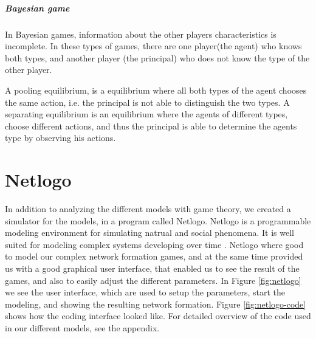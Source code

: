 \subparagraph{Bayesian game}
In Bayesian games, information about the other players characteristics is incomplete. In these types of games, there are one player(the agent) who knows both types, and another player (the principal) who does not know the type of the other player. 

A pooling equilibrium, is a equilibrium where all both types of the agent chooses the same action, i.e. the principal is not able to distinguish the two types. 
A separating equilibrium is an equilibrium where the agents of different types, choose different actions, and thus the principal is able to determine the agents type by observing his actions.


\section{Netlogo}
In addition to analyzing the different models with game theory, we created a simulator for the models, in a program called Netlogo. Netlogo is a programmable modeling environment for simulating natrual and social phenomena. It is well suited for modeling complex systems developing over time \cite{netlogo}.
Netlogo where good to model our complex network formation games, and at the same time provided us with a good graphical user interface, that enabled us to see the result of the games, and also to easily adjust the different parameters.
In Figure \ref{fig:netlogo} we see the user interface, which are used to setup the parameters, start the modeling, and showing the resulting network formation. Figure \ref{fig:netlogo-code} shows how the coding interface looked like. For detailed overview of the code used in our different models, see the appendix.
